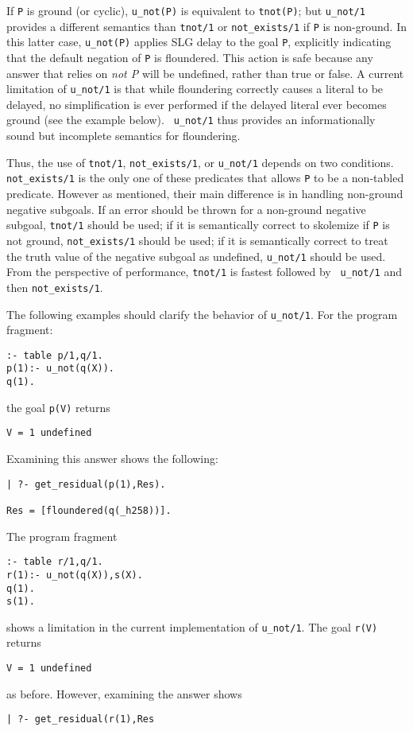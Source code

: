 \begin{description}
If {\tt P} is ground (or cyclic), {\tt u\_not(P)} is equivalent to
{\tt tnot(P)}; but {\tt u\_not/1} provides a different semantics than
{\tt tnot/1} or {\tt not\_exists/1} if {\tt P} is non-ground.  In this
latter case, {\tt u\_not(P)} applies SLG delay to the goal {\tt P},
explicitly indicating that the default negation of {\tt P} is
floundered.  This action is safe because any answer that relies on
{\em not P} will be undefined, rather than true or false.  A current
limitation of {\tt u\_not/1} is that while floundering correctly
causes a literal to be delayed, no simplification is ever performed if
the delayed literal ever becomes ground (see the example below).  {\tt
  u\_not/1} thus provides an informationally sound but incomplete
semantics for floundering.

Thus, the use of {\tt tnot/1}, {\tt not\_exists/1}, or {\tt u\_not/1}
depends on two conditions.  {\tt not\_exists/1} is the only one of these
predicates that allows {\tt P} to be a non-tabled predicate.  However
as mentioned, their main difference is in handling non-ground negative
subgoals.  If an error should be thrown for a non-ground negative
subgoal, {\tt tnot/1} should be used; if it is semantically correct to
skolemize if {\tt P} is not ground, {\tt not\_exists/1} should be used; if
it is semantically correct to treat the truth value of the negative
subgoal as undefined, {\tt u\_not/1} should be used.  From the
perspective of performance, {\tt tnot/1} is fastest followed by {\tt
  u\_not/1} and then {\tt not\_exists/1}.

The following examples should clarify the behavior of {\tt u\_not/1}.
For the program fragment:
\begin{verbatim}
:- table p/1,q/1.
p(1):- u_not(q(X)).
q(1).
\end{verbatim}
the goal {\tt p(V)} returns 
\begin{verbatim}
V = 1 undefined
\end{verbatim}
Examining this answer shows the following:
\begin{verbatim}
| ?- get_residual(p(1),Res).

Res = [floundered(q(_h258))].
\end{verbatim}
The program fragment
\begin{verbatim}
:- table r/1,q/1.
r(1):- u_not(q(X)),s(X).
q(1).
s(1).
\end{verbatim}
shows a limitation in the current implementation of {\tt u\_not/1}.
The goal {\tt r(V)} returns
\begin{verbatim}
V = 1 undefined
\end{verbatim}
as before.  However, examining the answer shows
\begin{verbatim}
| ?- get_residual(r(1),Res


\end{verbatim}
\end{description}

